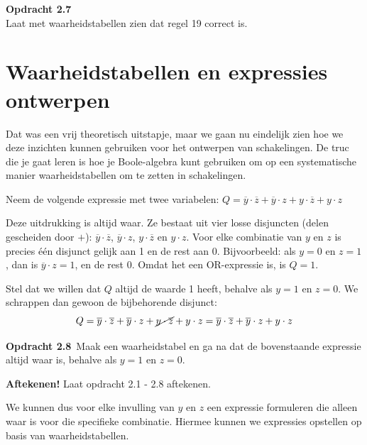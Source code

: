 \documentclass[11pt,a5paper]{report}
\begin{document}
\begin{framed}
\textbf{Opdracht 2.7}\\
Laat met waarheidstabellen zien dat regel 19 correct is.
\end{framed}

\section*{Waarheidstabellen en expressies ontwerpen}

Dat was een vrij theoretisch uitstapje, maar we gaan nu eindelijk zien hoe we deze inzichten kunnen gebruiken voor het ontwerpen van schakelingen. De truc die je gaat leren is hoe je Boole-algebra kunt gebruiken om op een systematische manier waarheidstabellen om te zetten in schakelingen.

Neem de volgende expressie met twee variabelen:
\(
Q = \overline{y} \cdot \overline{z} + \overline{y} \cdot z + y \cdot \overline{z} + y \cdot z
\)

Deze uitdrukking is altijd waar. Ze bestaat uit vier losse disjuncten (delen gescheiden door $+$): $\overline{y} \cdot \overline{z}$, $\overline{y} \cdot z$, $y \cdot \overline{z}$ en $y \cdot z$. Voor elke combinatie van $y$ en $z$ is precies één disjunct gelijk aan 1 en de rest aan 0. Bijvoorbeeld: als $y = 0$ en $z = 1$, dan is $\overline{y} \cdot z = 1$, en de rest 0. Omdat het een OR-expressie is, is $Q = 1$.

Stel dat we willen dat $Q$ altijd de waarde 1 heeft, behalve als $y = 1$ en $z = 0$. We schrappen dan gewoon de bijbehorende disjunct:
\[
Q = \overline{y} \cdot \overline{z} + \overline{y} \cdot z + \cancel{y \cdot \overline{z}} + y \cdot z = \overline{y} \cdot \overline{z} + \overline{y} \cdot z + y \cdot z
\]

\begin{framed}
\textbf{Opdracht 2.8}\
Maak een waarheidstabel en ga na dat de bovenstaande expressie altijd waar is, behalve als $y = 1$ en $z = 0$.
\end{framed}

\begin{framed}
\textbf{Aftekenen!} Laat opdracht 2.1 - 2.8 aftekenen.
\end{framed}


We kunnen dus voor elke invulling van $y$ en $z$ een expressie formuleren die alleen waar is voor die specifieke combinatie. Hiermee kunnen we expressies opstellen op basis van waarheidstabellen.
\end{document}
